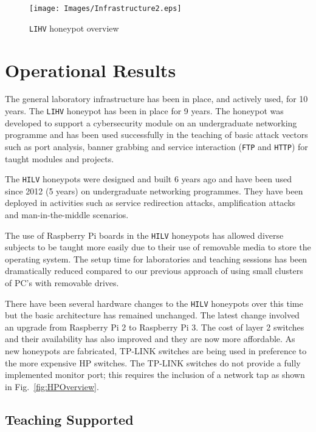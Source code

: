 \documentclass[10pt,journal]{IEEEtran}
\begin{document}
\begin{figure}[h]
\begin{center}
	\texttt{[image: Images/Infrastructure2.eps]}
  \caption{\texttt{LIHV} honeypot overview}
\label{fig:Overview2}
\end{center}
\end{figure}

\section{Operational Results\label{sec:Results}}

The general laboratory infrastructure has been in place, and actively used, for
10 years. The \texttt{LIHV} honeypot has been in place for 9 years. The
honeypot was developed to support a cybersecurity module on an undergraduate
networking programme and has been used successfully in the teaching of basic
attack vectors such as port analysis, banner grabbing and service interaction
(\texttt{FTP} and \texttt{HTTP}) for taught modules and projects.

The \texttt{HILV} honeypots were designed and built 6 years ago and have been
used since 2012 (5 years) on undergraduate networking programmes. They have been
deployed in activities such as service redirection attacks, amplification
attacks and man-in-the-middle scenarios.

The use of Raspberry Pi boards in the \texttt{HILV} honeypots has allowed
diverse subjects to be taught more easily due to their use of removable media
to store the operating system. The setup time for laboratories and teaching
sessions has been dramatically reduced compared to our previous approach of
using small clusters of PC's with removable drives.

There have been several hardware changes to the \texttt{HILV} honeypots over
this time but the basic architecture has remained unchanged. The latest change
involved an upgrade from Raspberry Pi 2 to Raspberry Pi 3. The cost of layer 2
switches and their availability has also improved and they are now more
affordable. As new honeypots are fabricated, TP-LINK switches are being used in
preference to the more expensive HP switches. The TP-LINK switches do not
provide a fully implemented monitor port; this requires the inclusion of a
network tap as shown in Fig.~\ref{fig:HPOverview}.

\subsection{Teaching Supported\label{ResourceSupport}}
\end{document}
